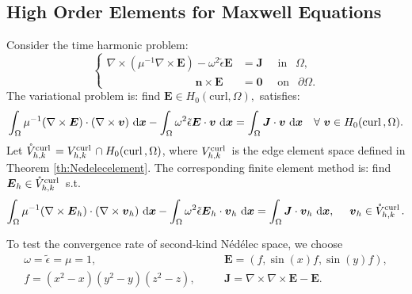 \documentclass[mathpazo]{cicp}
\begin{document}
\subsection{High Order Elements for Maxwell Equations}
Consider the time harmonic problem:
$$
\begin{cases}
\nabla \times (\mu^{-1}\nabla \times \boldsymbol E) - \omega^2 \tilde \epsilon
\boldsymbol E & = \boldsymbol J \quad \text{ in } \ \ \Omega,\\
\qquad\qquad\qquad\qquad \boldsymbol n \times \boldsymbol E & = \boldsymbol 0 \quad \text{ on } \ \
\partial \Omega.
\end{cases}
$$
The variational problem is: find $\boldsymbol E \in H_0(\mathrm{curl}, \Omega),$ satisfies:
\begin{align*}
\int_{\Omega}\mu^{-1}(\nabla \times \boldsymbol E)
\cdot (\nabla \times \boldsymbol v) \ \mathrm d\boldsymbol x - 
\int_{\Omega}\omega^2 \tilde 
\epsilon \boldsymbol E \cdot \boldsymbol v\ \mathrm d\boldsymbol x
= \int_{\Omega}\boldsymbol J \cdot \boldsymbol v \ \mathrm d\boldsymbol x \quad  \forall \ \boldsymbol v \in H_0({\rm curl\,}, \Omega).
\end{align*}
Let $\mathring{V}_{h,k}^{{\rm curl\,}} = V_{h,k}^{{\rm curl\,}} \cap H_0({\rm curl\,}, \Omega)$, where 
$V_{h,k}^{{\rm curl\,}} $ is the edge element space defined in Theorem \ref{th:Nedelecelement}. The corresponding finite element method is: find 
$\boldsymbol E_h \in \mathring{V}_{h,k}^{{\rm curl\,}}$ s.t.
\begin{align}
\label{exm1:eq1}
\int_{\Omega}\mu^{-1}(\nabla \times \boldsymbol E_h)
\cdot (\nabla \times \boldsymbol v_h) \ \mathrm d\boldsymbol x -
\int_{\Omega}\omega^2 \tilde
\epsilon \boldsymbol E_h \cdot \boldsymbol v_h\ \mathrm d\boldsymbol x
= \int_{\Omega}\boldsymbol J \cdot \boldsymbol v_h \ \mathrm d\boldsymbol x, \quad \ 
\boldsymbol v_h \in  \mathring{V}_{h,k}^{\curl}.
\end{align} 


To test the convergence rate of second-kind N\'ed\'elec space, we choose 
\begin{align*}
&\omega  = \tilde \epsilon = \mu = 1, & \quad & \boldsymbol E = (f, \sin(x)f, \sin(y)f),&\\
& f = (x^2-x)(y^2-y)(z^2-z),& \quad & \boldsymbol J  = \nabla\times\nabla\times \boldsymbol E - \boldsymbol E. &
\end{align*}
\end{document}
